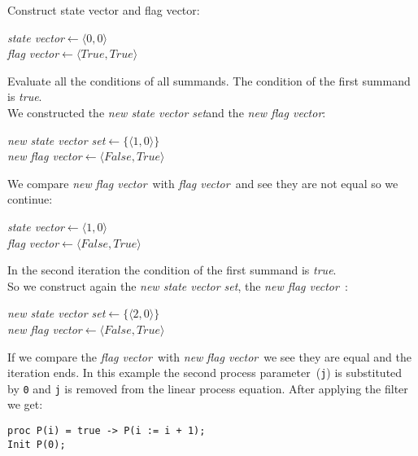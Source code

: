 \documentclass[a4paper,10pt]{article}
\newcommand{\lpe}{linear process equation}
\newcommand{\pp}{process parameter}
\newcommand{\ti}{\textit}
\newcommand{\sv}{\textit{state vector}}
\newcommand{\fv}{\textit{flag vector}}
\newcommand{\svs}{\textit{new state vector set}}
\newcommand{\nfv}{\textit{new flag vector}}
\newcommand{\la}{$\leftarrow$}
\begin{document}
Construct state vector and flag vector: 
\begin{center}\begin{minipage}{250pt}
\sv \la  $\langle 0 , 0 \rangle$\\
\fv \la  $\langle True , True \rangle$\\
\end{minipage}\end{center}

Evaluate all the conditions of all summands.
The condition of the first summand is \ti{true}.\\

We constructed the \svs and the \nfv :
\begin{center}\begin{minipage}{250pt}
\svs \la  $\lbrace \langle 1 , 0 \rangle \rbrace $\\
\nfv \la $\langle False , True \rangle $
\end{minipage}\end{center}

We compare \ti{new} \fv\ with \fv\ and see they are not equal so we continue:
\begin{center}\begin{minipage}{250pt}
\sv \la $\langle 1 , 0 \rangle $\\
\fv \la $\langle False , True \rangle $\\
\end{minipage}\end{center}

In the second iteration the condition of the first summand is \ti{true}.\\
So we construct again the \svs, the \nfv\ : 
\begin{center}\begin{minipage}{250pt}
\svs \la  $\lbrace \langle 2 , 0 \rangle \rbrace $\\
\nfv \la  $\langle False , True \rangle $ \\
\end{minipage}\end{center}

If we compare the \fv\ with \ti{new} \fv\ we see they are equal and the iteration ends.
In this example the second \pp\ (\verb"j") is substituted by \verb"0" and \verb"j" is removed from the \lpe.
After applying the filter we get:\\
\begin{verbatim}
proc P(i) = true -> P(i := i + 1);
Init P(0);
\end{verbatim}
\end{document}
